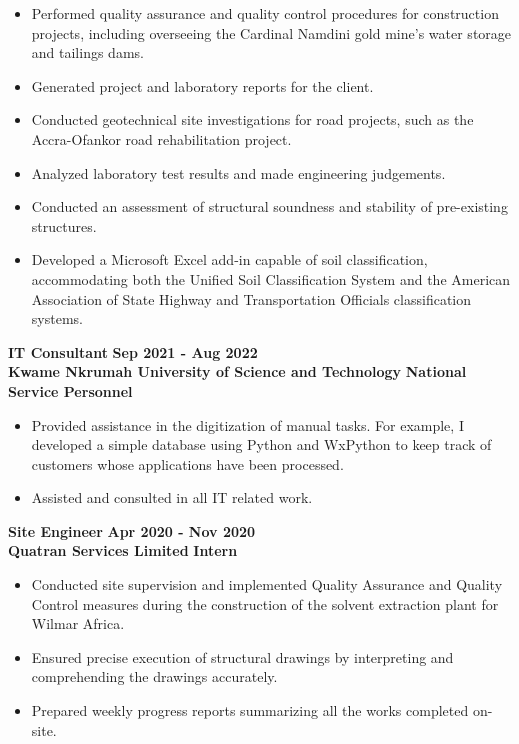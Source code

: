 \documentclass[letterpaper, 11pt]{article}
\newcommand{\verticalSpace}{4pt}
\begin{document}
\begin{itemize}[leftmargin=*]

	\item Performed quality assurance and quality control procedures for construction projects, including
	      overseeing the Cardinal Namdini gold mine's water storage and tailings dams.
	\item Generated project and laboratory reports for the client.
	\item Conducted geotechnical site investigations for road projects, such as the Accra-Ofankor
	      road rehabilitation project.
	\item Analyzed laboratory test results and made engineering judgements.
	\item Conducted an assessment of structural soundness and stability of pre-existing structures.
	\item Developed a Microsoft Excel add-in capable of soil classification, accommodating both the
	      Unified Soil Classification System and the
	      American Association of State Highway and Transportation Officials classification systems.

\end{itemize}

\textbf{IT Consultant} \hfill \textbf{Sep 2021 - Aug 2022} \\ [\verticalSpace]
\textbf{Kwame Nkrumah University of Science and Technology} \hfill \textbf{National Service Personnel}

\begin{itemize}[leftmargin=*]

	\item Provided assistance in the digitization of manual tasks. For example,
	      I developed a simple database using Python and WxPython to keep track of
	      customers whose applications have been processed.
	\item Assisted and consulted in all IT related work.

\end{itemize}

\textbf{Site Engineer} \hfill \textbf{Apr 2020 - Nov 2020} \\ [\verticalSpace]
\textbf{Quatran Services Limited} \hfill \textbf{Intern}

\begin{itemize}[leftmargin=*]

	\item Conducted site supervision and implemented Quality Assurance and Quality Control
	      measures during the construction of the solvent extraction plant for Wilmar Africa.
	\item Ensured precise execution of structural drawings by interpreting and comprehending
	      the drawings accurately.
	\item Prepared weekly progress reports summarizing all the works completed on-site.

\end{itemize}
\end{document}
